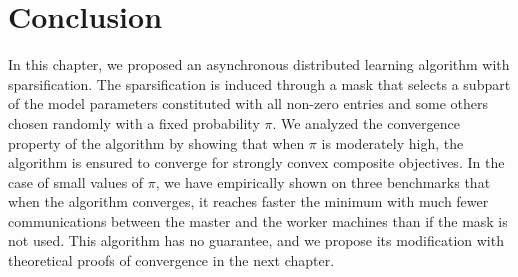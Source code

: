 \section{Conclusion}\label{sec:conclusion}
In this chapter, we proposed an asynchronous distributed learning algorithm with sparsification. The sparsification is induced through a mask that selects a subpart of the model parameters constituted with all non-zero entries and some others chosen randomly with a fixed probability $\pi$. We analyzed the convergence property of the algorithm by showing that when $\pi$ is moderately high, the algorithm is ensured to converge for strongly convex composite objectives. In the case of small values of $\pi$, we have empirically shown on three benchmarks that when the algorithm converges, it reaches faster the minimum with much fewer communications between the master and the worker machines than if the mask is not used. This algorithm has no guarantee, and we propose its modification with theoretical proofs of convergence in the next chapter.